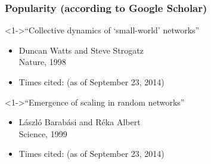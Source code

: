 \begin{frame}
  \frametitle{Popularity (according to Google Scholar)}

  \begin{block}<1->{``Collective dynamics of `small-world' networks''\cite{watts1998a}}
    \begin{itemize}
    \item[] 
      Duncan Watts and Steve Strogatz\\
      Nature, 1998
    \item[] 
      {Times cited:  }
      {\tiny(as of September 23, 2014)}
      \end{itemize}
    \end{block}

  \begin{block}<1->{``Emergence of scaling in random networks''\cite{barabasi1999a}}
    \begin{itemize}
    \item[] 
      L\'{a}szl\'{o} Barab\'{a}si and R\'{e}ka Albert\\
      Science, 1999
    \item[] 
      {Times cited: }
      {\tiny(as of September 23, 2014)}
    \end{itemize}
  \end{block}
\end{frame}


